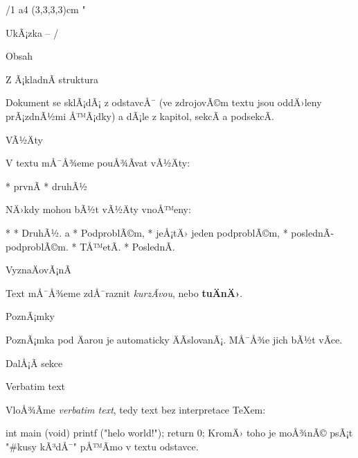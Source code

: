 \chyph                      %
\fontfam[Schola]            %
\margins/1 a4 (3,3,3,3)cm   %
\typosize[11/13]            %
\activettchar"              %
\hyperlinks\Blue\Green      %

\def\lorem{\lipsumtext[1]}  %

\def\center{\noindent\hfil}  %



\tit UkÃ¡zka -- \OpTeX/

\nonum\notoc\sec Obsah

\maketoc



\sec Z Ã¡kladnÃ­ struktura

Dokument se sklÃ¡dÃ¡ z odstavcÅ¯ (ve zdrojovÃ©m textu jsou oddÄ›leny prÃ¡zdnÃ½mi Å™Ã¡dky)
a dÃ¡le z kapitol, sekcÃ­ a podsekcÃ­. \lorem

\lorem

\secc VÃ½Äty

V textu mÅ¯Å¾eme pouÅ¾Ã­vat vÃ½Äty:

\begitems
* prvnÃ­
* druhÃ½
\enditems

\lorem

NÄ›kdy mohou bÃ½t vÃ½Äty vnoÅ™eny:

\begitems
* \lorem
* DruhÃ½.
  \begitems \style a
  * PodproblÃ©m,
  * jeÅ¡tÄ› jeden podproblÃ©m,
  * poslednÃ­ podproblÃ©m.
  \enditems
* TÅ™etÃ­.
* PoslednÃ­.
\enditems
 
\lorem

\secc VyznaÄovÃ¡nÃ­

Text mÅ¯Å¾eme zdÅ¯raznit {\it kurzÃ­vou}, nebo {\bf tuÄnÄ›}. \lorem

\secc[poznamky]  PoznÃ¡mky

PoznÃ¡mka pod Äarou je automaticky ÄÃ­slovanÃ¡.
MÅ¯Å¾e jich bÃ½t vÃ­ce.
\lorem\ \lorem

\sec[dalsi] DalÅ¡Ã­ sekce

\lorem

\secc Verbatim text

VloÅ¾Ã­me {\it verbatim text}, tedy text  bez interpretace
\TeX{}em:

\begtt
int main (void) {
  printf ("helo world!\n");
  return 0;
}
\endtt
KromÄ› toho je moÅ¾nÃ© psÃ¡t "#kusy {kÃ³dÅ¯}" pÅ™Ã­mo v textu odstavce.

